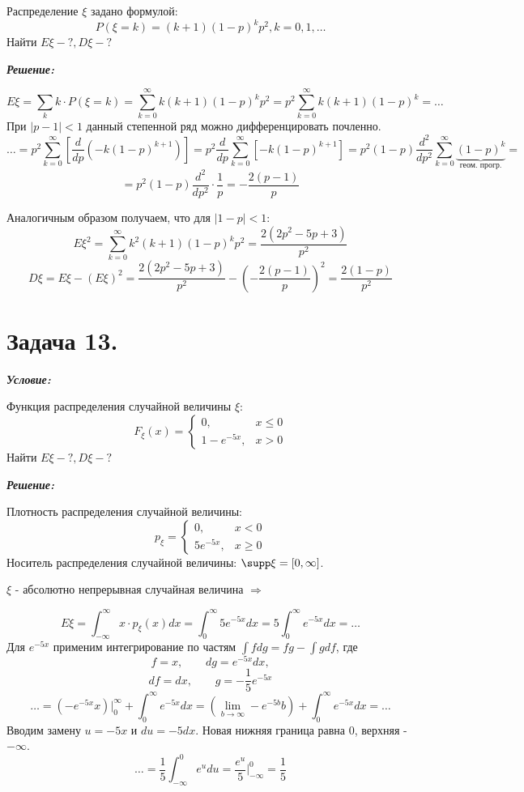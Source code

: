 Распределение $\xi$ задано формулой:
\[
P(\xi = k) = (k+1)(1-p)^kp^2, k = 0,1,\dots
\]
Найти $E\xi - ?, D\xi - ?$

\noindent\textit{\textbf{Решение:}}

\[
E\xi = \sum_{k} k \cdot P(\xi = k) = \sum_{k=0}^{\infty} k(k+1)(1-p)^kp^2 = p^2 \sum_{k=0}^{\infty} k(k+1)(1-p)^k = \dots \]
При $|p-1|<1$ данный степенной ряд можно дифференцировать почленно.
\[
\dots = p^2 \sum_{k=0}^{\infty} \left[ \frac{d}{dp} (-k(1-p)^{k+1}) \right] = p^2 \frac{d}{dp} \sum_{k=0}^{\infty} \left[ -k(1-p)^{k+1} \right] = p^2(1-p) \frac{d^2}{dp^2} \sum_{k=0}^{\infty} \underbrace{(1-p)^{k}}_{\text{геом. прогр.}} =
\]
\[
= p^2(1-p) \frac{d^2}{dp^2} \cdot \frac{1}{p} = - \frac{2(p-1)}{p}
\]

Аналогичным образом получаем, что для $|1-p|<1$:
\[
E\xi^2 = \sum_{k=0}^{\infty} k^2(k+1)(1-p)^kp^2 = \frac{2(2p^2-5p+3)}{p^2}
\]
\[
D\xi = E\xi - (E\xi)^2 = \frac{2(2p^2-5p+3)}{p^2} - \left(-\frac{2(p-1)}{p}\right)^2 = \frac{2(1-p)}{p^2}
\]

\section*{Задача 13.}

\noindent\textit{\textbf{Условие:}}

Функция распределения случайной величины $\xi$:
\[
F_{\xi}(x) =
\begin{cases}
0, &x \le 0 \\
1 - e^{-5x}, &x > 0
\end{cases}
\]
Найти $E\xi - ?, D\xi - ?$

\noindent\textit{\textbf{Решение:}}

Плотность распределения случайной величины:
\[
p_{\xi} =
\begin{cases}
	0, &x < 0 \\
	5e^{-5x}, &x \ge 0
\end{cases}
\]
Носитель распределения случайной величины: $\supp \xi = [0, \infty]$.

$\xi$ - абсолютно непрерывная случайная величина $\Rightarrow$

\[
E\xi = \int_{-\infty}^{\infty} x \cdot p_{\xi} (x) dx = \int_{0}^{\infty} 5e^{-5x} dx = 5\int_{0}^{\infty} e^{-5x} dx = \dots
\]
Для $e^{-5x}$ применим интегрирование по частям $\int f dg = fg - \int g df$, где
\[
f = x, ~~~~~~~~~ dg = e^{-5x}dx,
\]
\[
df = dx, ~~~~~~~~~ g = -\frac{1}{5} e^{-5x}
\]
\[
\dots = (-e^{-5x}x) \bigg|_{0}^{\infty} + \int_{0}^{\infty} e^{-5x} dx = \left( \lim_{b \to \infty} -e^{-5b} b \right) + \int_{0}^{\infty} e^{-5x} dx = \dots
\]
Вводим замену $u=-5x$ и $du=-5dx$. Новая нижняя граница равна $0$, верхняя - $- \infty$.
\[
\dots = \frac{1}{5} \int_{-\infty}^{0} e^udu = \frac{e^u}{5} \bigg|_{-\infty}^{0} = \frac{1}{5}
\]

